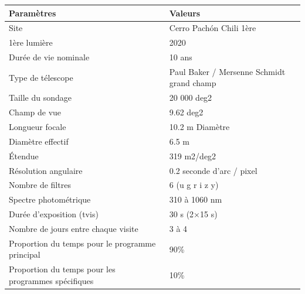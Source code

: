 \begin{tabular}{|p{10cm}|p{6cm}|}
\hline 
Paramètres & Valeurs \\
\hline 
 Site & Cerro Pachón Chili 1ère \\
\hline 
 1ère lumière & 2020 \\
\hline 
 Durée de vie nominale & 10 ans\\
\hline 
 Type de télescope & Paul Baker / Mersenne Schmidt grand champ \\
\hline 
Taille du sondage & 20 000 deg2 \\
\hline 
Champ de vue & 9.62 deg2 \\
\hline 
Longueur focale & 10.2 m Diamètre \\
\hline 
Diamètre effectif & 6.5 m \\
\hline 
Étendue & 319 m2/deg2 \\
\hline 
Résolution angulaire & 0.2 seconde d'arc / pixel\\
\hline 
Nombre de filtres & 6 (u g r i z y) \\
\hline 
Spectre photométrique & 310 à 1060 nm \\
\hline 
Durée d'exposition (tvis) & 30 s (2×15 s) \\
\hline 
Nombre de jours entre chaque visite & 3 à 4 \\
\hline 
Proportion du temps pour le programme principal & 90\% \\
\hline 
Proportion du temps pour les programmes spécifiques & 10\% \\
\hline
\end{tabular}
\newline
\newline

